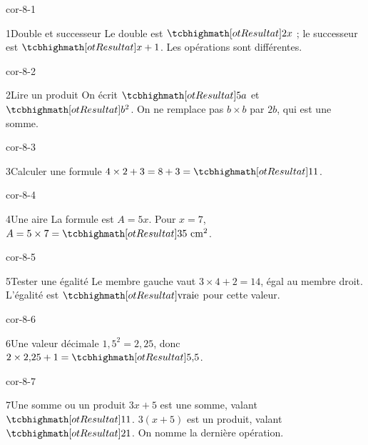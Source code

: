 \clearpage\pagestyle{otMain}\setlength{\otBlocEspacement}{2.5mm}\fontsize{11}{15}\selectfont{}
\begin{blocLivre}{cor-8-1}\begin{corrige}{1}{Double et successeur}
Le double est $\res{2x}$ ; le successeur est $\res{x+1}$. Les opérations sont différentes.
\end{corrige}\end{blocLivre}
\begin{blocLivre}{cor-8-2}\begin{corrige}{2}{Lire un produit}
On écrit $\res{5a}$ et $\res{b^2}$. On ne remplace pas $b\times b$ par $2b$, qui est une somme.
\end{corrige}\end{blocLivre}
\begin{blocLivre}{cor-8-3}\begin{corrige}{3}{Calculer une formule}
$4\times2+3=8+3=\res{11}$.
\end{corrige}\end{blocLivre}
\begin{blocLivre}{cor-8-4}\begin{corrige}{4}{Une aire}
La formule est $A=5x$. Pour $x=7$, $A=5\times7=\res{35\ \mathrm{cm}^2}$.
\label{fig-cor-8-4}
\end{corrige}\end{blocLivre}
\begin{blocLivre}{cor-8-5}\begin{corrige}{5}{Tester une égalité}
Le membre gauche vaut $3\times4+2=14$, égal au membre droit. L’égalité est $\res{\text{vraie}}$ pour cette valeur.
\end{corrige}\end{blocLivre}
\begin{blocLivre}{cor-8-6}\begin{corrige}{6}{Une valeur décimale}
$1{,}5^2=2{,}25$, donc $2\times2{,}25+1=\res{5{,}5}$.
\end{corrige}\end{blocLivre}
\begin{blocLivre}{cor-8-7}\begin{corrige}{7}{Une somme ou un produit}
$3x+5$ est une somme, valant $\res{11}$. $3(x+5)$ est un produit, valant $\res{21}$. On nomme la dernière opération.
\end{corrige}\end{blocLivre}
